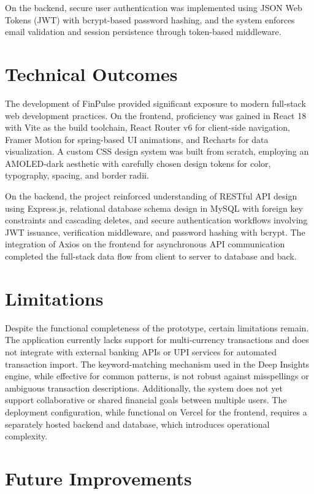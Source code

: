 On the backend, secure user authentication was implemented using JSON Web Tokens (JWT) with bcrypt-based password hashing, and the system enforces email validation and session persistence through token-based middleware.

\section{Technical Outcomes}

The development of FinPulse provided significant exposure to modern full-stack web development practices. On the frontend, proficiency was gained in React 18 with Vite as the build toolchain, React Router v6 for client-side navigation, Framer Motion for spring-based UI animations, and Recharts for data visualization. A custom CSS design system was built from scratch, employing an AMOLED-dark aesthetic with carefully chosen design tokens for color, typography, spacing, and border radii.

On the backend, the project reinforced understanding of RESTful API design using Express.js, relational database schema design in MySQL with foreign key constraints and cascading deletes, and secure authentication workflows involving JWT issuance, verification middleware, and password hashing with bcrypt. The integration of Axios on the frontend for asynchronous API communication completed the full-stack data flow from client to server to database and back.

\section{Limitations}

Despite the functional completeness of the prototype, certain limitations remain. The application currently lacks support for multi-currency transactions and does not integrate with external banking APIs or UPI services for automated transaction import. The keyword-matching mechanism used in the Deep Insights engine, while effective for common patterns, is not robust against misspellings or ambiguous transaction descriptions. Additionally, the system does not yet support collaborative or shared financial goals between multiple users. The deployment configuration, while functional on Vercel for the frontend, requires a separately hosted backend and database, which introduces operational complexity.

\section{Future Improvements}

